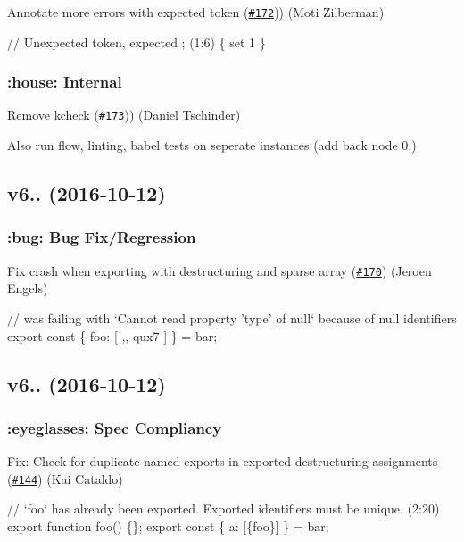 Annotate more errors with expected token (\href{https://github.com/babel/babylon/pull/172}{\tt \#172})) (Moti Zilberman)


\begin{DoxyCode}
// Unexpected token, expected ; (1:6)
\{ set 1 \}
\end{DoxyCode}


\subsubsection*{\+:house\+: Internal}

Remove kcheck (\href{https://github.com/babel/babylon/pull/173}{\tt \#173})) (Daniel Tschinder)

Also run flow, linting, babel tests on seperate instances (add back node 0.)

\subsection*{v6.. (2016-\/10-\/12)}

\subsubsection*{\+:bug\+: Bug Fix/\+Regression}

Fix crash when exporting with destructuring and sparse array (\href{https://github.com/babel/babylon/pull/170}{\tt \#170}) (Jeroen Engels)


\begin{DoxyCode}
// was failing with `Cannot read property 'type' of null` because of null identifiers
export const \{ foo: [ ,, qux7 ] \} = bar;
\end{DoxyCode}


\subsection*{v6.. (2016-\/10-\/12)}

\subsubsection*{\+:eyeglasses\+: Spec Compliancy}

Fix\+: Check for duplicate named exports in exported destructuring assignments (\href{https://github.com/babel/babylon/pull/144}{\tt \#144}) (Kai Cataldo)


\begin{DoxyCode}
// `foo` has already been exported. Exported identifiers must be unique. (2:20)
export function foo() \{\};
export const \{ a: [\{foo\}] \} = bar;
\end{DoxyCode}


